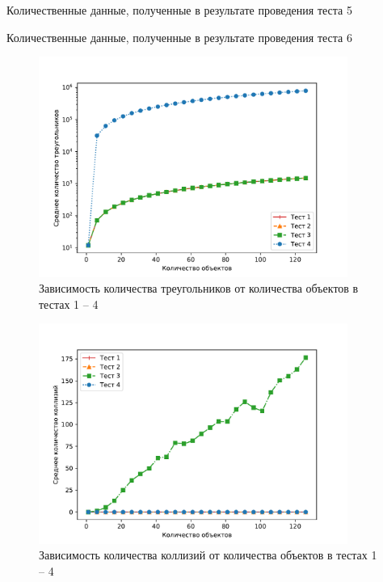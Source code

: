 \begin{table}[H]
    \caption{Количественные данные, полученные в результате проведения теста 5}
    \label{tab:test5}
    \begin{adjustbox}{width=1\textwidth}
        
    \end{adjustbox}
\end{table}

\begin{table}[H]
    \caption{Количественные данные, полученные в результате проведения теста 6}
    \label{tab:test6}
    \begin{adjustbox}{width=1\textwidth}
        
    \end{adjustbox}
\end{table}

\newpage

\begin{figure}[H]
	\centering
    \includegraphics[width=0.9\textwidth]{img/1234/plot_triangles.pdf}
	\caption{Зависимость количества треугольников от количества объектов в тестах 1 -- 4}
	\label{fig:1234:tr}
\end{figure}

\begin{figure}[H]
	\centering
    \includegraphics[width=0.9\textwidth]{img/1234/plot_collisions.pdf}
	\caption{Зависимость количества коллизий от количества объектов в тестах 1 -- 4}
	\label{fig:1234:col}
\end{figure}

